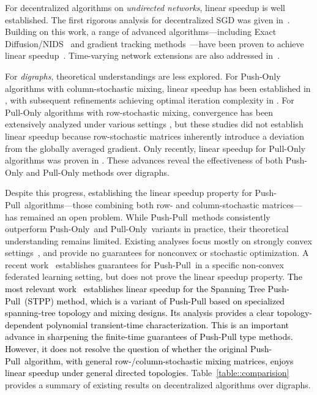 \documentclass[10pt]{article}
\newcommand{\pushonly}{{\sc Push-Only}\xspace}
\newcommand{\pushpull}{{\sc Push-Pull}\xspace}
\newcommand{\pullonly}{{\sc Pull-Only}\xspace}
\newcommand{\revision}[1]{\textcolor{black}{#1}}
\begin{document}
For decentralized algorithms on \emph{undirected networks}, linear speedup is well established. The first rigorous analysis for decentralized SGD was given in~\cite{lian2017can}. Building on this work, a range of advanced algorithms---including Exact Diffusion/NIDS~\cite{yuan2018exact,li2019decentralized} and gradient tracking methods~\cite{xu2015augmented,di2016next,qu2017harnessing,Nedic2017pushdiging}---have been proven to achieve linear speedup~\cite{pu2021distributed}. Time-varying network extensions are also addressed in~\cite{koloskova2020unified}.  

For \emph{digraphs}, theoretical understandings are less  explored. For \pushonly algorithms with column-stochastic mixing, linear speedup has been established in \cite{assran2019stochastic,kungurtsev2023decentralized}, with subsequent refinements achieving optimal iteration complexity in \cite{liang2025understanding}. For \pullonly algorithms with row-stochastic mixing, convergence has been extensively analyzed under various settings \cite{mai2016distributed,li2019row,FROST-Xinran,ghaderyan2023fast,lu2020nesterov}, but these studies did not establish linear speedup because row-stochastic matrices inherently introduce a deviation from the globally averaged gradient. Only recently, linear speedup for \pullonly algorithms was proven in \cite{liang2025achieving}. These advances reveal the  effectiveness of both \pushonly and \pullonly methods over digraphs.

Despite this progress, establishing the linear speedup property for \pushpull\ algorithms—those combining both row- and column-stochastic matrices—has remained an open problem. While \pushpull\ methods consistently outperform \pushonly\ and \pullonly\ variants in practice, their theoretical understanding remains limited. Existing analyses focus mostly on strongly convex settings~\cite{xin2018linear, xin2019SAB, pu2020push, you2024bary}, and provide no guarantees for nonconvex or stochastic optimization. 
A recent work~\cite{ying2025exact} establishes guarantees for \pushpull\ in a specific non-convex federated learning setting, but does not prove the linear speedup property. 
\revision{
The most relevant work~\cite{you2025distributed} establishes linear speedup for the Spanning Tree Push-Pull~(STPP) method, which is a variant of Push-Pull based on specialized spanning-tree topology and mixing designs. Its analysis provides a clear topology-dependent polynomial transient-time characterization. This is an important advance in sharpening the finite-time guarantees of Push-Pull type methods. However, it does not resolve the question of whether the original \pushpull\ algorithm, with general row-/column-stochastic mixing matrices, enjoys linear speedup under general directed topologies.}
Table~\ref{table::comparision} provides a summary of existing results on decentralized algorithms over digraphs.
\end{document}
